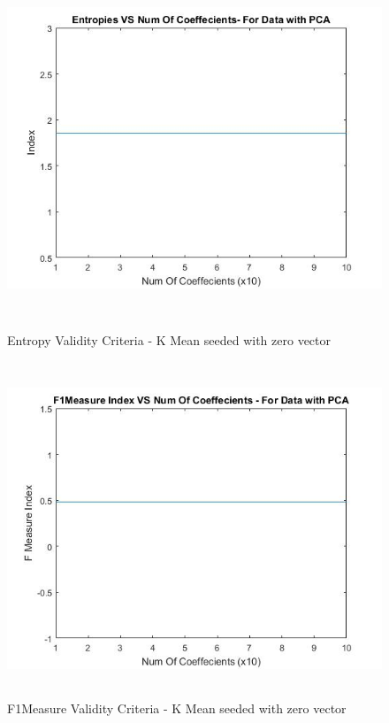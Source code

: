 \documentclass[conference]{IEEEtran}
\begin{document}
\begin{enumerate}
\begin{figure}
\includegraphics[height =10cm]{Entropies_withPCA_withSeed.jpg}
\caption{Entropy Validity Criteria - K Mean seeded with zero vector}
\includegraphics[height=10cm]{Fmeasure_withPCA_withSeed.jpg}
\caption{F1Measure Validity Criteria - K Mean seeded with zero vector}
\label{External2}
\end{figure}


\end{enumerate}
\end{document}
